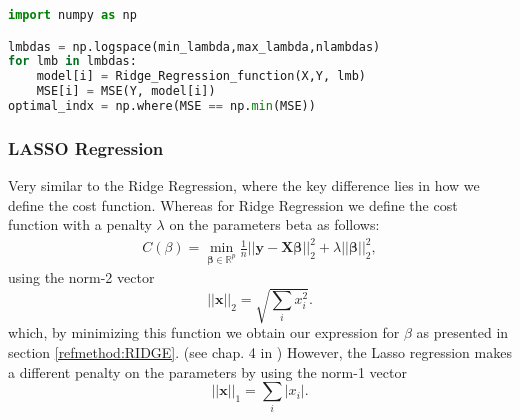 \documentclass[../main.tex]{subfiles}
\begin{document}
\begin{lstlisting}[language=Python]
import numpy as np

lmbdas = np.logspace(min_lambda,max_lambda,nlambdas)
for lmb in lmbdas:
    model[i] = Ridge_Regression_function(X,Y, lmb)
    MSE[i] = MSE(Y, model[i])
optimal_indx = np.where(MSE == np.min(MSE))
\end{lstlisting}


\subsubsection{LASSO Regression}\label{refmethod:LASSO}
Very similar to the Ridge Regression, where the key difference lies in how we define the cost function. Whereas for Ridge Regression we define the cost function with a penalty $\lambda$ on the parameters beta as follows:
\begin{align}
    C(\beta) = 
    \min_{\boldsymbol{\beta}\in
{\mathbb{R}}^{p}}\frac{1}{n}\vert\vert \boldsymbol{y}-\boldsymbol{X}\boldsymbol{\beta}\vert\vert_2^2+\lambda\vert\vert \boldsymbol{\beta}\vert\vert_2^2 ,\label{eq:cost_func_ridge}
\end{align}
using the norm-2 vector 
\begin{equation*} \label{eq:norm_2_vector}
    \vert\vert \boldsymbol{x}\vert\vert_2 = \sqrt{\sum_i x_i^2}.
\end{equation*}
which, by minimizing this function we obtain our expression for $\beta$ as presented in section \eqref{refmethod:RIDGE}. (see chap. 4 in \cite{Lecture_notes_Morten}) However, the Lasso regression makes a different penalty on the parameters by using the norm-1 vector
\begin{equation*} \label{eq:norm_2_vector}
    \vert\vert \boldsymbol{x}\vert\vert_1 = {\sum_i \vert x_i\vert}.
\end{equation*}
\end{document}
